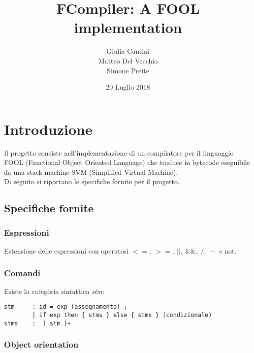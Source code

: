 \documentclass[a4paper]{article}   %
\begin{document}
\title{FCompiler: A FOOL implementation}
\author{Giulia Cantini\\
        Matteo Del Vecchio\\
        Simone Preite}
\date{20 Luglio 2018}    %
\maketitle

\tableofcontents

\section{Introduzione}

Il progetto consiste nell'implementazione di un compilatore per il linguaggio FOOL (Functional Object Oriented Language) che traduce in bytecode
eseguibile da una stack machine SVM (Simplified Virtual Machine).\\
Di seguito si riportano le specifiche fornite per il progetto.

\subsection{Specifiche fornite}

\subsubsection{Espressioni}

Estensione delle espressioni con operatori $ <=,\ >=,\ ||,\ \&\&,\ / ,\ - $ e not.

\subsubsection{Comandi}

Esiste la categoria sintattica \textit{stm}:\\
\begin{lstlisting}[language=ANTLR,basicstyle=\footnotesize\ttfamily]
stm		: id = exp (assegnamento) ;
		| if exp then { stms } else { stms } (condizionale)
stms	:  ( stm )+
\end{lstlisting}
\subsubsection{Object orientation}
\end{document}
